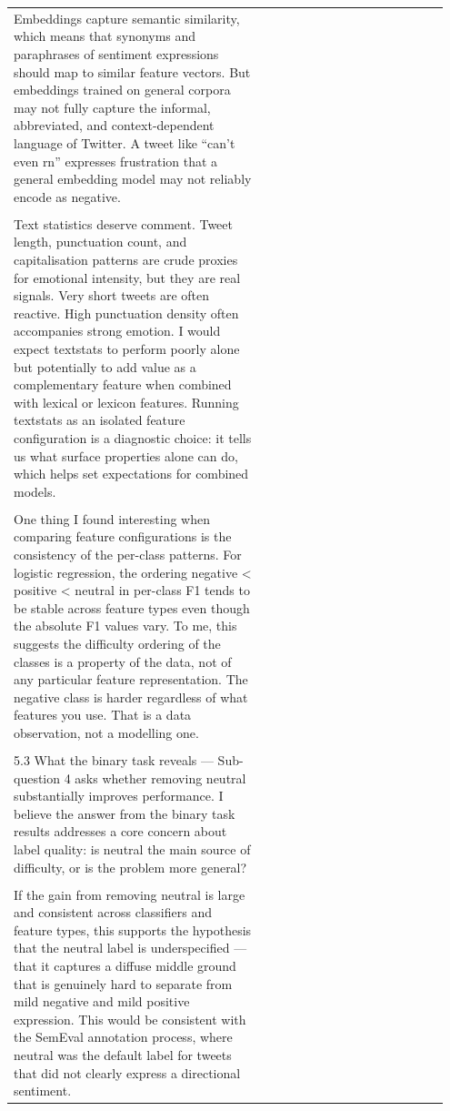\documentclass[11pt]{article}
\begin{document}
\begin{longtable}{|p{0.55\linewidth}|p{0.40\linewidth}|}
\hline
\rule{0pt}{3.5cm} & \\
\hline
Embeddings capture semantic similarity, which means that synonyms and paraphrases of sentiment expressions should map to similar feature vectors. But embeddings trained on general corpora may not fully capture the informal, abbreviated, and context-dependent language of Twitter. A tweet like ``can't even rn'' expresses frustration that a general embedding model may not reliably encode as negative. & \\[2pt]
\hline
\rule{0pt}{3.5cm} & \\
\hline
Text statistics deserve comment. Tweet length, punctuation count, and capitalisation patterns are crude proxies for emotional intensity, but they are real signals. Very short tweets are often reactive. High punctuation density often accompanies strong emotion. I would expect textstats to perform poorly alone but potentially to add value as a complementary feature when combined with lexical or lexicon features. Running textstats as an isolated feature configuration is a diagnostic choice: it tells us what surface properties alone can do, which helps set expectations for combined models. & \\[2pt]
\hline
\rule{0pt}{3.5cm} & \\
\hline
One thing I found interesting when comparing feature configurations is the consistency of the per-class patterns. For logistic regression, the ordering negative < positive < neutral in per-class F1 tends to be stable across feature types even though the absolute F1 values vary. To me, this suggests the difficulty ordering of the classes is a property of the data, not of any particular feature representation. The negative class is harder regardless of what features you use. That is a data observation, not a modelling one. & \\[2pt]
\hline
\rule{0pt}{3.5cm} & \\
\hline
5.3 What the binary task reveals --- Sub-question 4 asks whether removing neutral substantially improves performance. I believe the answer from the binary task results addresses a core concern about label quality: is neutral the main source of difficulty, or is the problem more general? & \\[2pt]
\hline
\rule{0pt}{3.5cm} & \\
\hline
If the gain from removing neutral is large and consistent across classifiers and feature types, this supports the hypothesis that the neutral label is underspecified --- that it captures a diffuse middle ground that is genuinely hard to separate from mild negative and mild positive expression. This would be consistent with the SemEval annotation process, where neutral was the default label for tweets that did not clearly express a directional sentiment. & \\[2pt]

\end{longtable}
\end{document}

